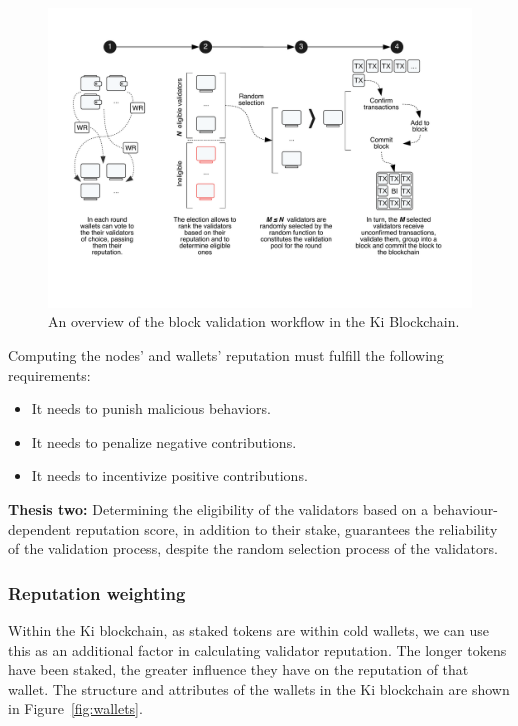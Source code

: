 \begin{figure}
	\includegraphics[width=\linewidth, trim= 1cm 3cm 1cm 2cm, clip]{Figures/workflow.pdf}
	\caption{An overview of the block validation workflow in the Ki Blockchain.}
	\label{fig:wf}
\end{figure}

Computing the nodes' and wallets' reputation must fulfill the following requirements:
\begin{itemize}
    \item It needs to punish malicious behaviors.
    \item It needs to penalize negative contributions.
    \item It needs to incentivize positive contributions.
\end{itemize}

\textbf{Thesis two:} Determining the eligibility of the validators based on a behaviour-dependent reputation score, in addition to their stake, guarantees the reliability of the validation process, despite the random selection process of the validators.

\subsubsection{Reputation weighting}
\label{sec:kiblockchainwallets}
Within the Ki blockchain, as staked tokens are within cold wallets, we can use this as an additional factor in calculating validator reputation. The longer tokens have been staked, the greater influence they have on the reputation of that wallet. The structure and attributes of the wallets in the Ki blockchain are shown in Figure~\ref{fig:wallets}.

